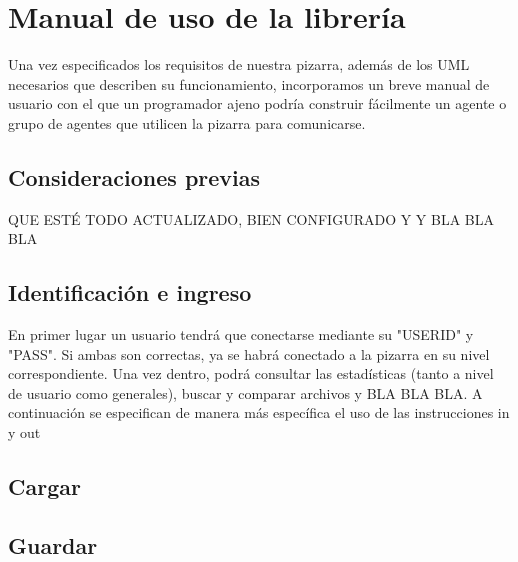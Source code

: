 \chapter{Manual de uso de la librería}
Una vez especificados los requisitos de nuestra pizarra, además de los UML necesarios que describen su funcionamiento, incorporamos un breve manual de usuario con el que un programador ajeno podría construir fácilmente un agente o grupo de agentes que utilicen la pizarra para comunicarse.

\section{Consideraciones previas}
\color{red}QUE ESTÉ TODO ACTUALIZADO, BIEN CONFIGURADO Y Y BLA BLA BLA
\color{black}
\section{Identificación e ingreso}
En primer lugar un usuario tendrá que conectarse mediante su "USERID" y "PASS". Si ambas son correctas, ya se habrá conectado a la pizarra en su nivel correspondiente.
Una vez dentro, podrá consultar las estadísticas (tanto a nivel de usuario como generales), buscar y comparar archivos y BLA BLA BLA.
A continuación se especifican de manera más específica el uso de las instrucciones in y out
\section{Cargar}
\section{Guardar}


